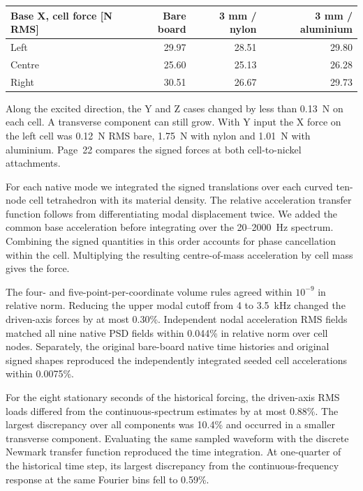 \begin{center}\small
\begin{tabular}{lrrr}\toprule
Base X, cell force [N RMS] & Bare board & 3 mm / nylon & 3 mm / aluminium\\\midrule
Left & 29.97 & 28.51 & 29.80\\
Centre & 25.60 & 25.13 & 26.28\\
Right & 30.51 & 26.67 & 29.73\\\bottomrule
\end{tabular}\end{center}

Along the excited direction, the Y and Z cases changed by less than 0.13~N on each cell. A transverse component can still grow. With Y input the X force on the left cell was 0.12~N RMS bare, 1.75~N with nylon and 1.01~N with aluminium. Page~22 compares the signed forces at both cell-to-nickel attachments.

For each native mode we integrated the signed translations over each curved ten-node cell tetrahedron with its material density. The relative acceleration transfer function follows from differentiating modal displacement twice. We added the common base acceleration before integrating over the 20--2000~Hz spectrum. Combining the signed quantities in this order accounts for phase cancellation within the cell. Multiplying the resulting centre-of-mass acceleration by cell mass gives the force.

The four- and five-point-per-coordinate volume rules agreed within $10^{-9}$ in relative norm. Reducing the upper modal cutoff from 4 to 3.5~kHz changed the driven-axis forces by at most 0.30\%. Independent nodal acceleration RMS fields matched all nine native PSD fields within 0.044\% in relative norm over cell nodes. Separately, the original bare-board native time histories and original signed shapes reproduced the independently integrated seeded cell accelerations within 0.0075\%.

For the eight stationary seconds of the historical forcing, the driven-axis RMS loads differed from the continuous-spectrum estimates by at most 0.88\%. The largest discrepancy over all components was 10.4\% and occurred in a smaller transverse component. Evaluating the same sampled waveform with the discrete Newmark transfer function reproduced the time integration. At one-quarter of the historical time step, its largest discrepancy from the continuous-frequency response at the same Fourier bins fell to 0.59\%.

